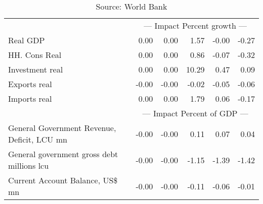 \documentclass{article}
\begin{document}
\begin{table}[ht]
\begin{tabular}{lrrrrr}
&\multicolumn{5}{c}{{--- Impact Percent growth ---}}                          \\
Real GDP & 0.00 & 0.00 & 1.57 & -0.00 & -0.27 \\
HH. Cons Real & 0.00 & 0.00 & 0.86 & -0.07 & -0.32 \\
Investment real & 0.00 & 0.00 & 10.29 & 0.47 & 0.09 \\
Exports real & -0.00 & -0.00 & -0.02 & -0.05 & -0.06 \\
Imports real & 0.00 & 0.00 & 1.79 & 0.06 & -0.17 \\
&\multicolumn{5}{c}{{--- Impact Percent of GDP ---}}                          \\
General Government Revenue, Deficit, LCU mn & -0.00 & -0.00 & 0.11 & 0.07 & 0.04 \\
General government gross debt millions lcu & -0.00 & -0.00 & -1.15 & -1.39 & -1.42 \\
Current Account Balance, US\$ mn & -0.00 & -0.00 & -0.11 & -0.06 & -0.01 \\
\bottomrule
\end{tabular}
\caption*{Source: World Bank}
\end{table}
\end{document}
